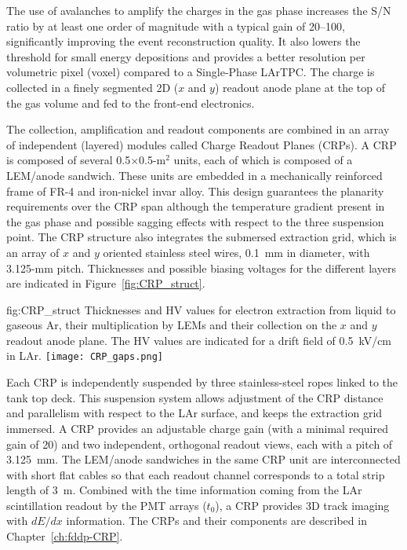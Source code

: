 The use of avalanches to amplify the charges in the gas phase increases the S/N ratio by at least one order of magnitude with a typical gain of 20--100, significantly improving the event reconstruction quality. It also lowers the threshold for small energy depositions and provides a better resolution per volumetric pixel (voxel) compared to a Single-Phase LArTPC.  The charge is collected in a finely segmented 2D ($x$ and $y$) readout anode plane at the top of the gas volume and fed to the front-end electronics.   

The  collection, amplification and readout components are combined in an array of independent (layered) modules called Charge Readout Planes (CRPs). A CRP is  composed of several 0.5$\times$0.5-m$^2$ units, each of which is composed  of a LEM/anode sandwich.  These units are embedded in a mechanically reinforced frame of FR-4 and iron-nickel invar alloy. This design guarantees the planarity requirements over the CRP span although the temperature gradient present in the gas phase and possible sagging effects with respect to the three suspension point. The CRP structure also integrates  the submersed extraction grid, which is an array of $x$ and $y$ oriented stainless steel wires, 0.1~mm in diameter, with 3.125-mm pitch. Thicknesses and possible biasing voltages for the different layers are indicated in Figure~\ref{fig:CRP_struct}.

\begin{dunefigure}{fig:CRP_struct}
{Thicknesses and HV values for electron extraction from liquid to gaseous Ar, their  multiplication by LEMs and their collection on the $x$ and $y$ readout anode plane. The HV values are indicated for a drift field of 0.5~kV/cm in LAr.}
\texttt{[image: CRP\_gaps.png]}
\end{dunefigure}

Each CRP is independently suspended by three stainless-steel ropes linked to the tank top deck. This suspension system allows adjustment of the CRP distance and parallelism with respect to the LAr surface, and keeps the extraction grid immersed. A CRP provides an adjustable charge gain (with a minimal required gain of 20) and two independent, orthogonal readout views, each with a pitch of 3.125~mm.  The LEM/anode sandwiches  in the same CRP unit are interconnected with short flat cables so that each readout channel corresponds to a total strip length of 3~m. Combined with the time information coming from the LAr scintillation readout by the PMT arrays ($t_0$), a CRP provides 3D track imaging with $dE/dx$ information.  The CRPs and their components are described in Chapter~\ref{ch:fddp-CRP}.

